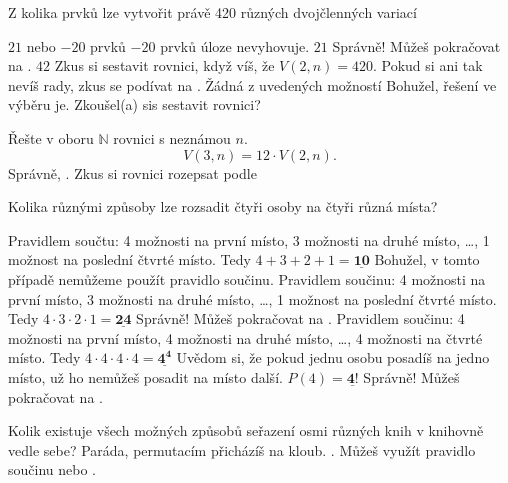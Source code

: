 \documentclass[language = czech]{webquiz}
\begin{document}
	\begin{question} \label{o3} %
		Z kolika prvků lze vytvořit právě 420 různých dvojčlenných variací
		\begin{choice}[columns=2]
			\incorrect $21$ nebo $-20$ prvků
			\feedback $-20$ prvků úloze nevyhovuje.
			\correct $21$
			\feedback Správně! Můžeš pokračovat na .
			\incorrect $42$
			\feedback Zkus si sestavit rovnici, když víš, že $V(2,n)=420$. Pokud si ani tak nevíš rady, zkus se podívat na .
			\incorrect Žádná z uvedených možností
			\feedback Bohužel, řešení ve výběru je. Zkoušel(a) sis sestavit rovnici?
		\end{choice}
	\end{question}
	
	\begin{question} \label{o4} %
		Řešte v oboru $\mathbb{N}$ rovnici s neznámou $n$. \[V(3,n)=12\cdot V(2,n).\]
		\whenRight Správně, .
		\whenWrong Zkus si rovnici rozepsat podle 
	\end{question}
	
	\begin{question} \label{o5} %
		Kolika různými způsoby lze rozsadit čtyři osoby na čtyři různá místa?
		\begin{choice}[multiple]
			\incorrect Pravidlem součtu: 4 možnosti na první místo,  3 možnosti na druhé místo, \dots, 1 možnost na poslední čtvrté místo. Tedy $4+3+2+1 = \mathbf{\underline{10}}$
			\feedback Bohužel, v tomto případě nemůžeme použít pravidlo součinu.
			\correct Pravidlem součinu: 4 možnosti na první místo,  3 možnosti na druhé místo, \dots, 1 možnost na poslední čtvrté místo. Tedy $4\cdot 3\cdot 2\cdot 1 = \mathbf{\underline{24}}$
			\feedback Správně! Můžeš pokračovat na .
			\incorrect Pravidlem součinu: 4 možnosti na první místo,  4 možnosti na druhé místo, \dots, 4 možnosti na čtvrté místo. Tedy $4\cdot 4\cdot 4\cdot 4 = \mathbf{\underline{4^4}}$
			\feedback Uvědom si, že pokud jednu osobu posadíš na jedno místo, už ho nemůžeš posadit na místo další.
			\correct $P(4)= \mathbf{\underline{4!}}$
			\feedback Správně! Můžeš pokračovat na .
		\end{choice}
	\end{question}
	 
	 \begin{question} \label{o6} %
	 	Kolik existuje všech možných způsobů seřazení osmi různých knih v knihovně vedle sebe?
	 	\whenRight Paráda, permutacím přicházíš na kloub. .
	 	\whenWrong Můžeš využít pravidlo součinu nebo .
	 \end{question}
	 
\end{document}
